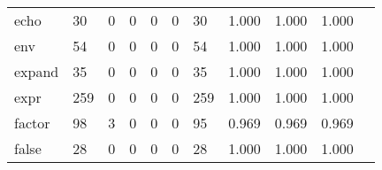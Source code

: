 \begin{longtable}{lp{1.20cm}p{1.20cm}p{1.20cm}p{1.20cm}p{1.20cm}p{1.20cm}p{1.20cm}p{1.20cm}p{1.20cm}p{1.20cm}}
echo      &                                    30 &                                                  0 &                                                  0 &                                                  0 &                                                  0 &                                                 30 &                                         1.000 &                                              1.000 &                                              1.000 \\
env       &                                    54 &                                                  0 &                                                  0 &                                                  0 &                                                  0 &                                                 54 &                                         1.000 &                                              1.000 &                                              1.000 \\
expand    &                                    35 &                                                  0 &                                                  0 &                                                  0 &                                                  0 &                                                 35 &                                         1.000 &                                              1.000 &                                              1.000 \\
expr      &                                   259 &                                                  0 &                                                  0 &                                                  0 &                                                  0 &                                                259 &                                         1.000 &                                              1.000 &                                              1.000 \\
factor    &                                    98 &                                                  3 &                                                  0 &                                                  0 &                                                  0 &                                                 95 &                                         0.969 &                                              0.969 &                                              0.969 \\
false     &                                    28 &                                                  0 &                                                  0 &                                                  0 &                                                  0 &                                                 28 &                                         1.000 &                                              1.000 &                                              1.000 \\

\end{longtable}
